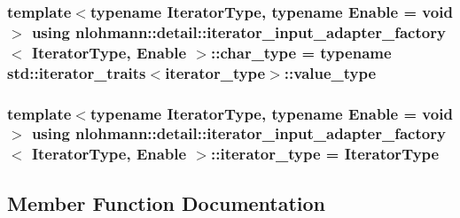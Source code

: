 \subsubsection[{\texorpdfstring{char\+\_\+type}{char_type}}]{\setlength{\rightskip}{0pt plus 5cm}template$<$typename Iterator\+Type, typename Enable = void$>$ using {\bf nlohmann\+::detail\+::iterator\+\_\+input\+\_\+adapter\+\_\+factory}$<$ Iterator\+Type, Enable $>$\+::{\bf char\+\_\+type} =  typename std\+::iterator\+\_\+traits$<${\bf iterator\+\_\+type}$>$\+::value\+\_\+type}\hypertarget{structnlohmann_1_1detail_1_1iterator__input__adapter__factory_a1439c0eda85f5f67199374d3254b8f2a}{}\label{structnlohmann_1_1detail_1_1iterator__input__adapter__factory_a1439c0eda85f5f67199374d3254b8f2a}
\subsubsection[{\texorpdfstring{iterator\+\_\+type}{iterator_type}}]{\setlength{\rightskip}{0pt plus 5cm}template$<$typename Iterator\+Type, typename Enable = void$>$ using {\bf nlohmann\+::detail\+::iterator\+\_\+input\+\_\+adapter\+\_\+factory}$<$ Iterator\+Type, Enable $>$\+::{\bf iterator\+\_\+type} =  Iterator\+Type}\hypertarget{structnlohmann_1_1detail_1_1iterator__input__adapter__factory_a37663ca283012236415d53145da1a0f9}{}\label{structnlohmann_1_1detail_1_1iterator__input__adapter__factory_a37663ca283012236415d53145da1a0f9}


\subsection{Member Function Documentation}
